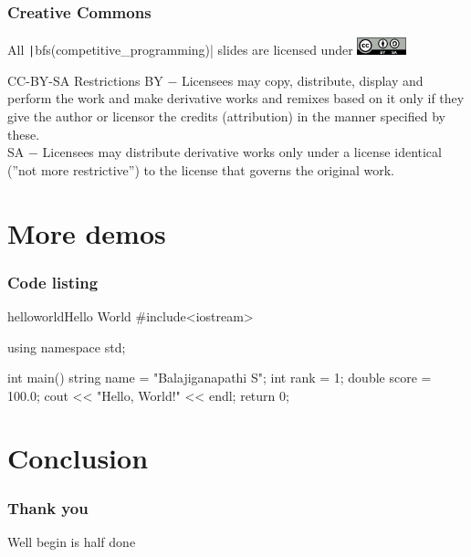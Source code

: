 \begin{frame}
    \frametitle{Creative Commons}
    All \texttt|bfs(competitive_programming)| slides are licensed under \includegraphics[height=0.5cm]{CC-BY-SA_icon.png}
    \begin{alertblock}{CC-BY-SA Restrictions}
        \alert{BY} $-$ Licensees may copy, distribute, display and perform the work and make derivative works and remixes based on it only if they give the author or licensor the credits (attribution) in the manner specified by these. \\
        \alert{SA} $-$ Licensees may distribute derivative works only under a license identical (''not more restrictive'') to the license that governs the original work.  \\
    \end{alertblock}
\end{frame}

\section{More demos}
\begin{frame}[fragile]
    \frametitle{Code listing}

    \begin{code}{helloworld}{Hello World}
        #include<iostream>
        
        using namespace std;

        int main() {
            string name = "Balajiganapathi S";
            int rank = 1;
            double score = 100.0;
            cout << "Hello, World!" << endl;
            return 0;
        }
    \end{code}
\end{frame}

\section{Conclusion}
\begin{frame}
    \frametitle{Thank you}
    Well begin is half done
\end{frame}



